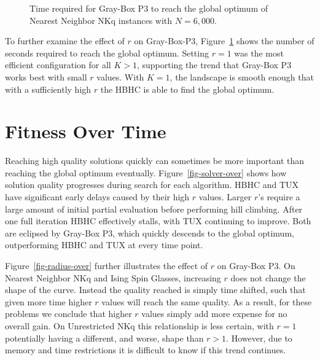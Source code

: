 \begin{figure}
  \centering
  \caption{Time required for Gray-Box P3 to reach the global optimum of Nearest Neighbor NKq instances with $N=6,000$.}
  \label{fig-p3-seconds}
\end{figure}

To further examine the effect of $r$ on Gray-Box-P3, Figure~\ref{fig-p3-seconds} shows the number of
seconds required to reach the global optimum. Setting $r=1$ was the most efficient configuration for all $K > 1$,
supporting the trend that Gray-Box P3 works best with small $r$ values. With $K=1$, the landscape is smooth enough
that with a sufficiently high $r$ the HBHC is able to find the global optimum.

\section{Fitness Over Time}
\label{sec-over-time}
\begin{figure*}
  \centering
  \caption{Comparison of solution quality during optimization on a log-log scale for different algorithms. For NKq-Landscapes $N=6,000$ and $K=4$ and
  for Ising Spin Glasses $N=6,084$. Each algorithm uses its best found $r$ value.}
  \label{fig-solver-over}
\end{figure*}

Reaching high quality solutions quickly can sometimes be more important than reaching the global optimum
eventually. Figure~\ref{fig-solver-over} shows how solution quality progresses during
search for each algorithm. HBHC and TUX have significant early delays caused by their high $r$ values. Larger
$r$'s require a large amount of initial partial evaluation before performing hill climbing. After one full iteration
HBHC effectively stalls, with TUX continuing to improve. Both are eclipsed by Gray-Box P3,
which quickly descends to the global optimum, outperforming HBHC and TUX at every time point.

Figure~\ref{fig-radius-over} further illustrates the effect of $r$ on Gray-Box P3. On Nearest Neighbor NKq
and Ising Spin Glasses, increasing $r$ does not change the shape of the curve. Instead the quality reached is simply time shifted,
such that given more time higher $r$ values will reach the same quality. As a result, for these problems we conclude
that higher $r$ values simply add more expense for no overall gain.
On Unrestricted NKq this relationship is less certain, with $r=1$ potentially having a different, and worse, shape than $r>1$.
However, due to memory and time restrictions it is difficult to know if this trend continues.

